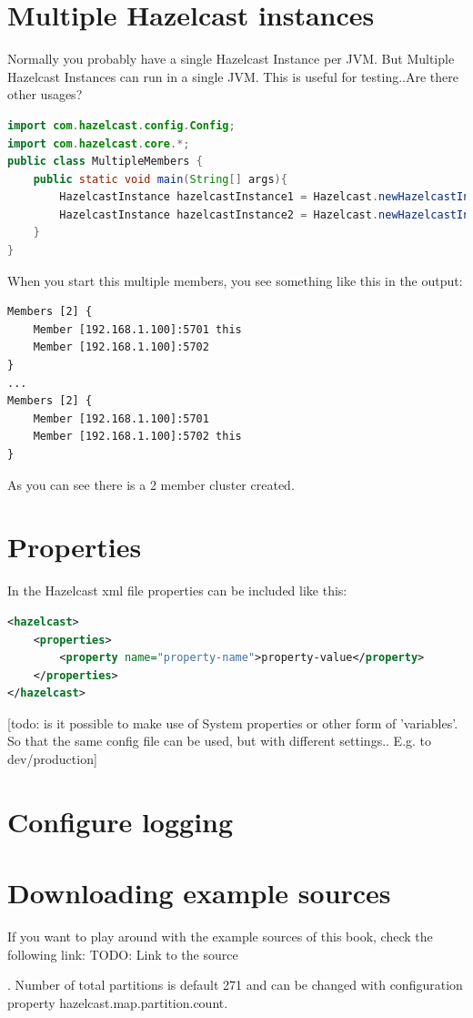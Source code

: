 \section{Multiple Hazelcast instances}
Normally you probably have a single Hazelcast Instance per JVM. But 
Multiple Hazelcast Instances can run in a single JVM. This is useful for testing..Are there other usages?

\begin{lstlisting}[language=java]
import com.hazelcast.config.Config;
import com.hazelcast.core.*;
public class MultipleMembers {
    public static void main(String[] args){
        HazelcastInstance hazelcastInstance1 = Hazelcast.newHazelcastInstance();
        HazelcastInstance hazelcastInstance2 = Hazelcast.newHazelcastInstance();
    }
}
\end{lstlisting}
When you start this multiple members, you see something like this in the output:
\begin{lstlisting}
Members [2] {
    Member [192.168.1.100]:5701 this
    Member [192.168.1.100]:5702
}
...
Members [2] {
    Member [192.168.1.100]:5701
    Member [192.168.1.100]:5702 this
}
\end{lstlisting}
As you can see there is a 2 member cluster created.

\section{Properties}
In the Hazelcast xml file properties can be included like this:
\begin{lstlisting}[language=xml]
<hazelcast>
    <properties>
        <property name="property-name">property-value</property>
    </properties>
</hazelcast>
\end{lstlisting}
[todo: is it possible to make use of System properties or other form of 'variables'. So that the same config file can be used, but with different settings.. E.g. to dev/production]

\section{Configure logging}

\section{Downloading example sources}
If you want to play around with the example sources of this book, check the following link:
TODO: Link to the source

. Number of total partitions is default 271 and can be changed with configuration property hazelcast.map.partition.count. 
